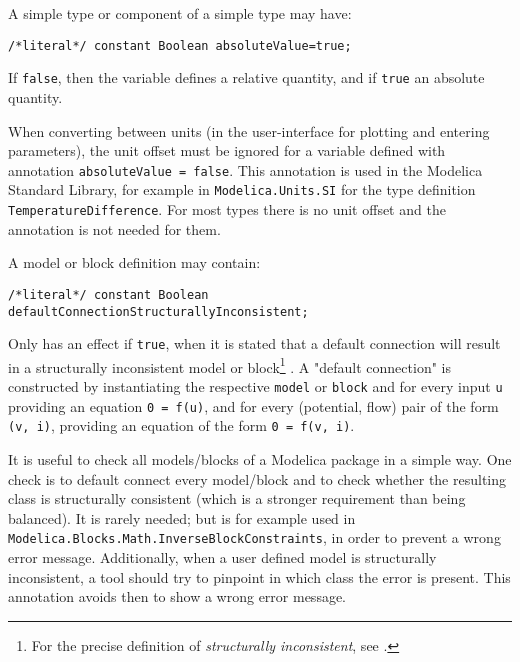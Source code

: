 A simple type or component of a simple type may have:
\begin{lstlisting}[language=modelica]
/*literal*/ constant Boolean absoluteValue=true;
\end{lstlisting}%

If \lstinline!false!, then the variable defines a relative quantity, and if \lstinline!true! an absolute quantity.

\begin{nonnormative}
When converting between units (in the user-interface for plotting and entering parameters), the unit offset must be ignored for a variable defined with annotation \lstinline!absoluteValue = false!.
This annotation is used in the Modelica Standard Library, for example in \lstinline!Modelica.Units.SI! for the type definition \lstinline!TemperatureDifference!.
For most types there is no unit offset and the annotation is not needed for them.
\end{nonnormative}

A model or block definition may contain:
\begin{lstlisting}[language=modelica]
/*literal*/ constant Boolean defaultConnectionStructurallyInconsistent;
\end{lstlisting}%

Only has an effect if \lstinline!true!, when it is stated that a default connection will result in a structurally inconsistent model or block\footnote{%
  For the precise definition of \emph{structurally inconsistent}, see \textcite{Pantelides1988ConsistentInitialization}.}%
.
A "default connection" is constructed by instantiating the respective \lstinline!model! or \lstinline!block! and for every input \lstinline!u! providing an equation \lstinline!0 = f(u)!, and for every (potential, flow) pair of the form \lstinline!(v, i)!, providing an equation of the form \lstinline!0 = f(v, i)!.

\begin{nonnormative}
It is useful to check all models/blocks of a Modelica package in a simple way.
One check is to default connect every model/block and to check whether the resulting class is structurally consistent (which is a stronger requirement than being balanced).
It is rarely needed; but is for example used in \lstinline!Modelica.Blocks.Math.InverseBlockConstraints!, in order to prevent a wrong error message.
Additionally, when a user defined model is structurally inconsistent, a tool should try to pinpoint in which class the error is present.
This annotation avoids then to show a wrong error message.
\end{nonnormative}

